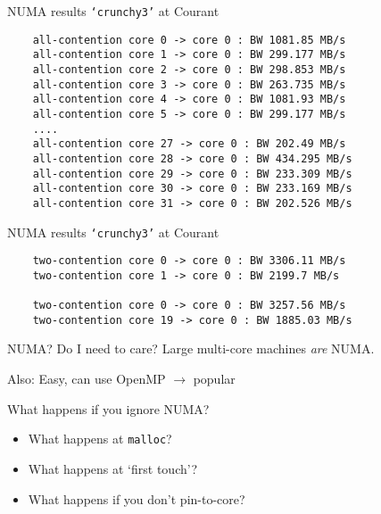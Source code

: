 \documentclass[english,compress]{beamer}
\begin{document}
\begin{frame}[fragile]{NUMA results}
  \texttt{`crunchy3'} at Courant

  \medskip
  \begin{lstlisting}
    all-contention core 0 -> core 0 : BW 1081.85 MB/s
    all-contention core 1 -> core 0 : BW 299.177 MB/s
    all-contention core 2 -> core 0 : BW 298.853 MB/s
    all-contention core 3 -> core 0 : BW 263.735 MB/s
    all-contention core 4 -> core 0 : BW 1081.93 MB/s
    all-contention core 5 -> core 0 : BW 299.177 MB/s
    ....
    all-contention core 27 -> core 0 : BW 202.49 MB/s
    all-contention core 28 -> core 0 : BW 434.295 MB/s
    all-contention core 29 -> core 0 : BW 233.309 MB/s
    all-contention core 30 -> core 0 : BW 233.169 MB/s
    all-contention core 31 -> core 0 : BW 202.526 MB/s
  \end{lstlisting}
\end{frame}
\begin{frame}[fragile]{NUMA results}
  \texttt{`crunchy3'} at Courant

  \medskip
  \begin{lstlisting}
    two-contention core 0 -> core 0 : BW 3306.11 MB/s
    two-contention core 1 -> core 0 : BW 2199.7 MB/s

    two-contention core 0 -> core 0 : BW 3257.56 MB/s
    two-contention core 19 -> core 0 : BW 1885.03 MB/s
  \end{lstlisting}
\end{frame}
\begin{frame}{NUMA? Do I need to care?}
  Large multi-core machines \emph{are} NUMA.

  \bigskip
  Also: Easy, can use OpenMP $\rightarrow$ popular

  \bigskip
  What happens if you ignore NUMA?
  \begin{itemize}
    \item What happens at \texttt{malloc}?
    \item What happens at `first touch'?
    \item What happens if you don't pin-to-core?
  \end{itemize}
\end{frame}
\end{document}
